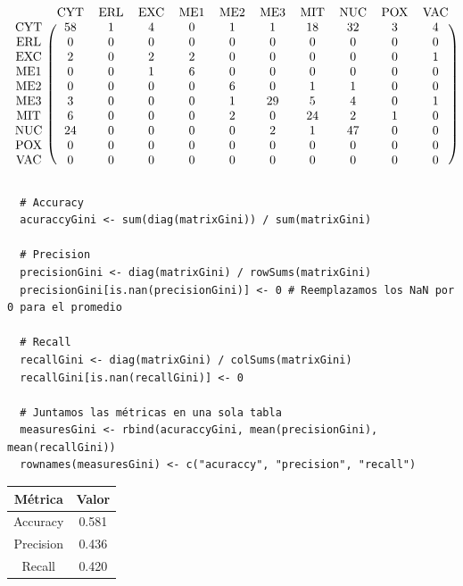 \documentclass[11pt]{article}
\begin{document}
\begin{equation*}
  \begin{blockarray}{ccccccccccc}
     & \text{CYT} &  \text{ERL} & \text{EXC} & \text{ME1} & \text{ME2} & \text{ME3} & \text{MIT} & \text{NUC} & \text{POX} & \text{VAC} \\
    \begin{block}{c(cccccccccc)} 
      \text{CYT} & 58 & 1 & 4 & 0 & 1 &  1  & 18  & 32 & 3 & 4 \\
      \text{ERL} &  0 & 0 & 0 & 0 & 0 &  0  &  0  &  0 & 0 & 0 \\
      \text{EXC} &  2 & 0 & 2 & 2 & 0 &  0  &  0  &  0 & 0 & 1 \\
      \text{ME1} &  0 & 0 & 1 & 6 & 0 &  0  &  0  &  0 & 0 & 0 \\
      \text{ME2} &  0 & 0 & 0 & 0 & 6 &  0  &  1  &  1 & 0 & 0 \\
      \text{ME3} &  3 & 0 & 0 & 0 & 1 & 29  &  5  &  4 & 0 & 1 \\
      \text{MIT} &  6 & 0 & 0 & 0 & 2 &  0  & 24  &  2 & 1 & 0 \\
      \text{NUC} & 24 & 0 & 0 & 0 & 0 &  2  &  1  & 47 & 0 & 0 \\
      \text{POX} &  0 & 0 & 0 & 0 & 0 &  0  &  0  &  0 & 0 & 0 \\
      \text{VAC} &  0 & 0 & 0 & 0 & 0 &  0  &  0  &  0 & 0 & 0 \\
    \end{block}
  \end{blockarray}
\end{equation*}

\begin{verbatim}
  # Accuracy 
  acuraccyGini <- sum(diag(matrixGini)) / sum(matrixGini)

  # Precision
  precisionGini <- diag(matrixGini) / rowSums(matrixGini)
  precisionGini[is.nan(precisionGini)] <- 0 # Reemplazamos los NaN por 0 para el promedio
  
  # Recall
  recallGini <- diag(matrixGini) / colSums(matrixGini)
  recallGini[is.nan(recallGini)] <- 0

  # Juntamos las métricas en una sola tabla
  measuresGini <- rbind(acuraccyGini, mean(precisionGini), mean(recallGini))
  rownames(measuresGini) <- c("acuraccy", "precision", "recall")
\end{verbatim}

\begin{table}[h!]
  \begin{center}
    \begin{tabular}{|c|c|}
      \hline
      Métrica     & Valor     \\ \hline
      Accuracy    & 0.581     \\ \hline
      Precision   & 0.436     \\ \hline
      Recall      & 0.420     \\ \hline
    \end{tabular}
  \end{center}
\end{table}
\end{document}
